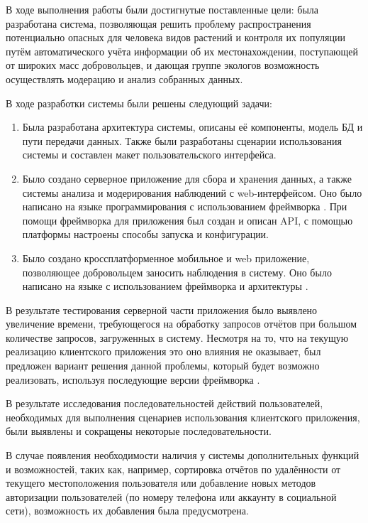 

\tab 
В ходе выполнения работы были достигнутые поставленные цели: была разработана система, позволяющая решить проблему распространения потенциально опасных для человека видов растений и контроля их популяции путём автоматического учёта информации об их местонахождении, поступающей от широких масс добровольцев, и дающая группе экологов возможность осуществлять модерацию и анализ собранных данных.

\tab
В ходе разработки системы были решены следующий задачи:
\begin{enumerate}
	\item Была разработана архитектура системы, описаны её компоненты, модель БД и пути передачи данных.
	Также были разработаны сценарии использования системы и составлен макет пользовательского интерфейса.
	\item Было создано серверное приложение для сбора и хранения данных, а также системы анализа и модерирования наблюдений с web-интерфейсом.
	Оно было написано на языке программирования  с использованием фреймворка .
	При помощи фреймворка  для приложения был создан и описан API, с помощью платформы  настроены способы запуска и конфигурации.
	\item Было создано кроссплатформенное мобильное и web приложение, позволяющее добровольцем заносить наблюдения в систему.
	Оно было написано на языке  с использованием фреймворка  и архитектуры .
\end{enumerate}

\tab
В результате тестирования серверной части приложения было выявлено увеличение времени, требующегося на обработку запросов отчётов при большом количестве запросов, загруженных в систему.
Несмотря на то, что на текущую реализацию клиентского приложения это оно влияния не оказывает, был предложен вариант решения данной проблемы, который будет возможно реализовать, используя последующие версии фреймворка .

\tab
В результате исследования последовательностей действий пользователей, необходимых для выполнения сценариев использования клиентского приложения, были выявлены и сокращены некоторые последовательности.

\tab
В случае появления необходимости наличия у системы дополнительных функций и возможностей, таких как, например, сортировка отчётов по удалённости от текущего местоположения пользователя или добавление новых методов авторизации пользователей (по номеру телефона или аккаунту в социальной сети), возможность их добавления была предусмотрена.
